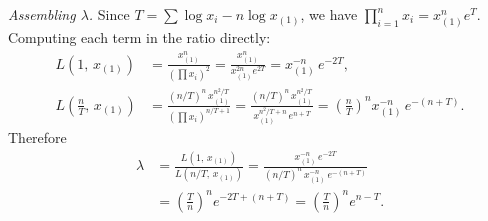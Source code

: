 \documentclass{article}
\theoremstyle{plain}
\theoremstyle{definition}
\begin{document}
\medskip
\noindent\textit{Assembling $\lambda$.}
Since $T=\sum\log x_i - n\log x_{(1)}$, we have
$\prod_{i=1}^{n}x_i = x_{(1)}^{n}e^{T}$.
Computing each term in the ratio directly:
\begin{align*}
  L(1,\,x_{(1)})
  &= \frac{x_{(1)}^{n}}{(\prod x_i)^{2}}
  = \frac{x_{(1)}^{n}}{x_{(1)}^{2n}e^{2T}}
  = x_{(1)}^{-n}\,e^{-2T}, \\[6pt]
  L\!\left(\tfrac{n}{T},\,x_{(1)}\right)
  &= \frac{(n/T)^{n}\,x_{(1)}^{n^{2}/T}}{(\prod x_i)^{n/T+1}}
  = \frac{(n/T)^{n}\,x_{(1)}^{n^{2}/T}}{x_{(1)}^{n^{2}/T+n}\,e^{n+T}}
  = \left(\frac{n}{T}\right)^{\!n} x_{(1)}^{-n}\,e^{-(n+T)}.
\end{align*}
Therefore
\begin{align*}
  \lambda
  &= \frac{L(1,\,x_{(1)})}{L(n/T,\,x_{(1)})}
  = \frac{x_{(1)}^{-n}\,e^{-2T}}{(n/T)^{n}\,x_{(1)}^{-n}\,e^{-(n+T)}} \\[6pt]
  &= \left(\frac{T}{n}\right)^{\!n} e^{-2T+(n+T)}
  = \left(\frac{T}{n}\right)^{\!n} e^{n-T}.
\end{align*}
\end{document}
